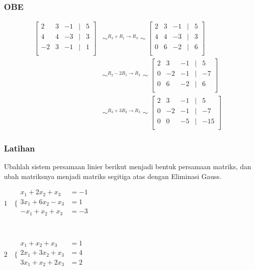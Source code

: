 \documentclass{beamer}
\begin{document}
\begin{frame}
\frametitle{OBE}
\begin{equation}
\begin{split}
\begin{bmatrix}
	2 & 3 & -1 &| &5\\
	4 & 4 & -3&| &3\\
	-2 & 3 & -1&| &1\\
\end{bmatrix} &\sim^{R_3+R_1 \rightarrow R_3}\sim 
\begin{bmatrix}
	2 & 3 & -1 &| &5\\
	4 & 4 & -3&| &3\\
	0 & 6 & -2&| &6\\
\end{bmatrix}
\\&\sim^{R_2-2R_1 \rightarrow R_2}\sim 
\begin{bmatrix}
	2 & 3 & -1 &| &5\\
	0 & -2 & -1&| &-7\\
	0 & 6 & -2&| &6\\
\end{bmatrix}
\\&\sim^{R_3+3R_2 \rightarrow R_3}\sim 
\begin{bmatrix}
	2 & 3 & -1 &| &5\\
	0 & -2 & -1&| &-7\\
	0 & 0 & -5&| &-15\\
\end{bmatrix}
\end{split}
\nonumber
\end{equation}

\end{frame}



\begin{frame}
\frametitle{Latihan}
Ubahlah sistem persamaan linier berikut menjadi bentuk persamaan matriks, dan ubah matriksnya menjadi matriks segitiga atas dengan Eliminasi Gauss.
\begin{center}
$1\quad \Biggl\{\begin{matrix}
	x_1+2x_2+x_3 & =-1\\
	3x_1+6x_2-x_3 & =1\\
	-x_1+x_2+x_3 & =-3\\
\end{matrix}$
\\\ \\\ \\
$2\quad \Biggl\{\begin{matrix}
	x_1+x_2+x_3 & =1\\
	2x_1+3x_2+x_3 & =4\\
	3x_1+x_2+2x_3 & =2\\
\end{matrix}$
\end{center}

\end{frame}
\end{document}
